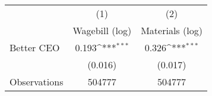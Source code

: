 {
\def\sym#1{\ifmmode^{#1}\else\(^{#1}\)\fi}
\begin{tabular}{l*{2}{c}}
\hline\hline
                    &\multicolumn{1}{c}{(1)}&\multicolumn{1}{c}{(2)}\\
                    &\multicolumn{1}{c}{Wagebill (log)}&\multicolumn{1}{c}{Materials (log)}\\
\hline
Better CEO          &       0.193\sym{***}&       0.326\sym{***}\\
                    &     (0.016)         &     (0.017)         \\
\hline
Observations        &      504777         &      504777         \\
\hline\hline
\end{tabular}
}
